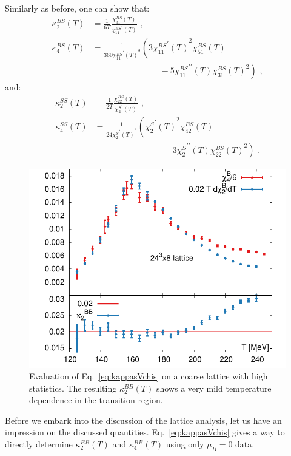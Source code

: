 \documentclass[aps,prd,twocolumn,superscriptaddress]{revtex4-2}
\begin{document}
Similarly as before, one can show that:
\begin{align}
\kappa_2^{BS} (T) &= \frac{1}{6T} 
\frac{\chi_{31}^{BS}(T)}{{\chi_{11}^{BS}}^\prime(T)}  \, \, ,
\\ \nonumber
\kappa_4^{BS} (T) &= 
\frac{1}{360{{\chi_{11}^{BS}}^\prime(T)}^3}  
\left( 3 {{\chi_{11}^{BS}}^\prime(T)}^2 \chi_{51}^{BS}(T) 
\right. \\  \nonumber
& \left. \qquad \qquad \qquad \qquad - 5 {\chi_{11}^{BS}}^{\prime \prime}(T) 
{\chi_{31}^{BS}(T)}^2 \right) \, \, ,
\end{align}
and: 
\begin{align}
\kappa_2^{SS} (T) &= \frac{1}{2T} 
\frac{\chi_{22}^{BS}(T)}{{\chi_2^S}^\prime(T)} \, \, , 
\\ \nonumber
\kappa_4^{SS} (T) &= 
\frac{1}{24{{\chi_2^S}^\prime(T)}^3}  
\left( {{\chi_2^S}^\prime(T)}^2 \chi_{42}^{BS}(T) 
\right. \\  \nonumber
& \left. \qquad \qquad \qquad \qquad - 3 {\chi_2^S}^{\prime \prime}(T) 
{\chi_{22}^{BS}(T)}^2 \right) \, \, .
\end{align}

\begin{figure}
\center
\includegraphics[width=\linewidth]{figures/BBBB_chider_24x8.pdf}
\caption{\label{fig:chider_24x8}
Evaluation of Eq.~\eqref{eq:kappasVchis} on a coarse lattice with high
statistics. The resulting $\kappa_2^{BB}(T)$ shows a very mild temperature
dependence in the transition region.
}
\end{figure}

Before we embark into the discussion of the lattice analysis, let us
have an impression on the discussed quantities.
Eq.~\eqref{eq:kappasVchis} gives a way to directly 
determine $\kappa_2^{BB}(T)$ and $\kappa_4^{BB}(T)$ using only $\mu_B=0$ data. 
\end{document}
